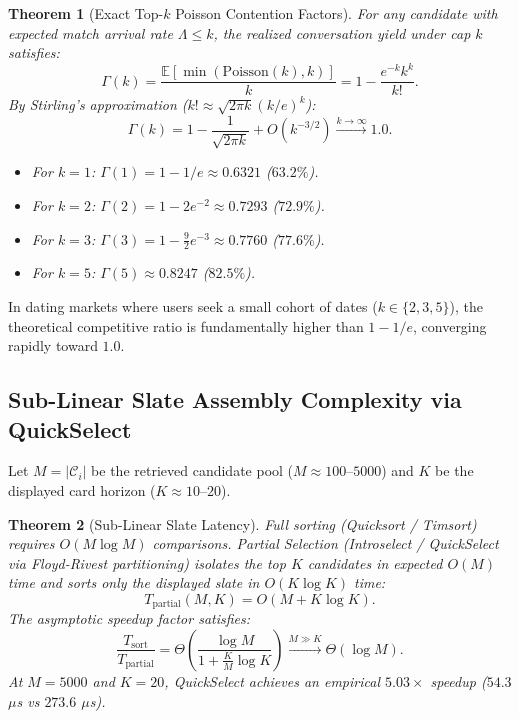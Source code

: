 \documentclass[11pt,letterpaper]{article}
\theoremstyle{definition}
\theoremstyle{plain}
\newtheorem{theorem}{Theorem}[section]
\theoremstyle{remark}
\begin{document}
\begin{theorem}[Exact Top-$k$ Poisson Contention Factors]
\label{thm:topk_poisson}
For any candidate with expected match arrival rate $\Lambda \le k$, the realized conversation yield under cap $k$ satisfies:
\begin{equation}
    \Gamma(k) = \frac{\mathbb{E}[\min(\mathrm{Poisson}(k), k)]}{k} = 1 - \frac{e^{-k} k^k}{k!}.
\end{equation}
By Stirling's approximation ($k! \approx \sqrt{2\pi k}(k/e)^k$):
\begin{equation}
    \Gamma(k) = 1 - \frac{1}{\sqrt{2\pi k}} + O(k^{-3/2}) \xrightarrow{k \to \infty} 1.0.
\end{equation}
\begin{itemize}[leftmargin=1.5em]
    \item For $k=1$: $\Gamma(1) = 1 - 1/e \approx \mathbf{0.6321}$ ($63.2\%$).
    \item For $k=2$: $\Gamma(2) = 1 - 2e^{-2} \approx \mathbf{0.7293}$ ($\mathbf{72.9\%}$).
    \item For $k=3$: $\Gamma(3) = 1 - \frac{9}{2}e^{-3} \approx \mathbf{0.7760}$ ($\mathbf{77.6\%}$).
    \item For $k=5$: $\Gamma(5) \approx \mathbf{0.8247}$ ($\mathbf{82.5\%}$).
\end{itemize}
\end{theorem}
In dating markets where users seek a small cohort of dates ($k \in \{2, 3, 5\}$), the theoretical competitive ratio is fundamentally higher than $1 - 1/e$, converging rapidly toward $1.0$.

\subsection{Sub-Linear Slate Assembly Complexity via QuickSelect}
Let $M = |\mathcal{C}_i|$ be the retrieved candidate pool ($M \approx 100\text{--}5000$) and $K$ be the displayed card horizon ($K \approx 10\text{--}20$).

\begin{theorem}[Sub-Linear Slate Latency]
\label{thm:complexity_quickselect}
Full sorting (Quicksort / Timsort) requires $O(M \log M)$ comparisons.
Partial Selection (Introselect / QuickSelect via Floyd-Rivest partitioning) isolates the top $K$ candidates in expected $O(M)$ time and sorts only the displayed slate in $O(K \log K)$ time:
\begin{equation}
    T_{\text{partial}}(M, K) = O(M + K \log K).
\end{equation}
The asymptotic speedup factor satisfies:
\begin{equation}
    \frac{T_{\text{sort}}}{T_{\text{partial}}} = \Theta\left(\frac{\log M}{1 + \frac{K}{M} \log K}\right) \xrightarrow{M \gg K} \Theta(\log M).
\end{equation}
At $M=5000$ and $K=20$, QuickSelect achieves an empirical $5.03\times$ speedup ($54.3$ $\mu$s vs $273.6$ $\mu$s).
\end{theorem}
\end{document}
